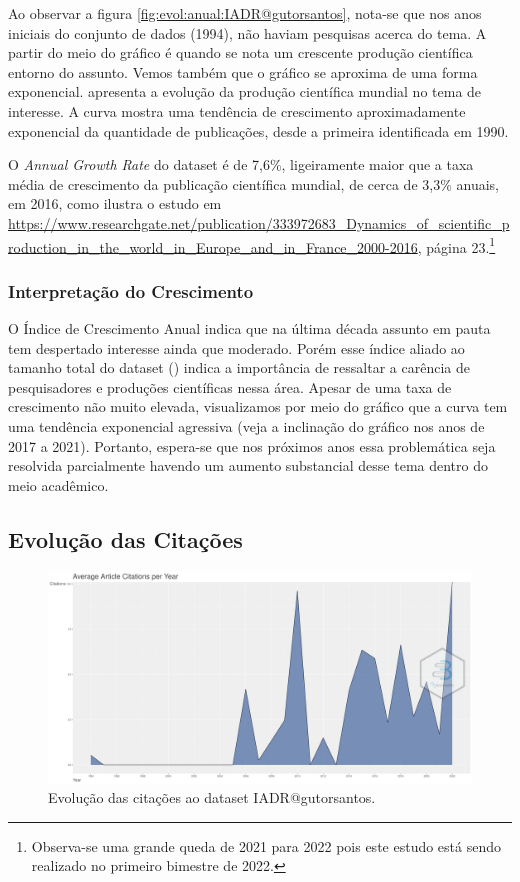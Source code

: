 Ao observar a figura \ref{fig:evol:anual:IADR@gutorsantos}, nota-se que nos anos iniciais do conjunto de dados (1994), não haviam pesquisas acerca do tema. A partir do meio do gráfico é quando se nota um crescente produção científica entorno do assunto. Vemos também que o gráfico se aproxima de uma forma exponencial. 
apresenta a evolução da produção científica mundial no tema de interesse. A curva mostra uma tendência de crescimento aproximadamente exponencial da quantidade de publicações, desde a primeira identificada em 1990.

O \textit{Annual Growth Rate} do dataset é de 7,6\%, ligeiramente maior que a taxa média de crescimento da publicação científica mundial, de cerca de 3,3\% anuais, em 2016, como ilustra o estudo em \url{https://www.researchgate.net/publication/333972683_Dynamics_of_scientific_production_in_the_world_in_Europe_and_in_France_2000-2016}, página 23.\footnote{Observa-se uma grande queda de 2021 para 2022 pois este estudo está sendo realizado no primeiro bimestre de 2022.}

\subsubsection{Interpretação do Crescimento} 

O Índice de Crescimento Anual indica que na última década assunto em pauta tem despertado interesse ainda que moderado. Porém esse índice aliado ao tamanho total do dataset (\totalDocumentsIADRgutorsantos{}) indica a importância de ressaltar a carência de pesquisadores e produções científicas nessa área. Apesar de uma taxa de crescimento não muito elevada, visualizamos por meio do gráfico que a curva tem uma tendência exponencial agressiva (veja a inclinação do gráfico nos anos de 2017 a 2021). Portanto, espera-se que nos próximos anos essa problemática seja resolvida parcialmente havendo um aumento substancial desse tema dentro do meio acadêmico.

\subsection{Evolução das Citações}
\label{sec:IADR@gutorsantos:Citations}

\begin{figure}[H]
    \centering
    \includegraphics[width=1\textwidth]{experiments/gutorsantos/AnaliseBibliometrica/IAeDiscriminacao/imgs/AverageArticleCitationPerYear-2022-02-09.png}
    \caption{Evolução das citações ao dataset IADR@gutorsantos.}
    \label{fig:evol:anual:citacoes:IADR@gutorsantos}
\end{figure}

